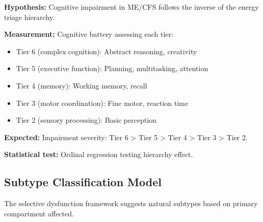 \begin{prediction}
\label{pred:cognitive-hierarchy}
\textbf{Hypothesis:} Cognitive impairment in ME/CFS follows the inverse of the energy triage hierarchy.

\textbf{Measurement:} Cognitive battery assessing each tier:
\begin{itemize}
    \item Tier 6 (complex cognition): Abstract reasoning, creativity
    \item Tier 5 (executive function): Planning, multitasking, attention
    \item Tier 4 (memory): Working memory, recall
    \item Tier 3 (motor coordination): Fine motor, reaction time
    \item Tier 2 (sensory processing): Basic perception
\end{itemize}

\textbf{Expected:} Impairment severity: Tier 6 > Tier 5 > Tier 4 > Tier 3 > Tier 2.

\textbf{Statistical test:} Ordinal regression testing hierarchy effect.
\end{prediction}


\subsection{Subtype Classification Model}

The selective dysfunction framework suggests natural subtypes based on primary compartment affected.

